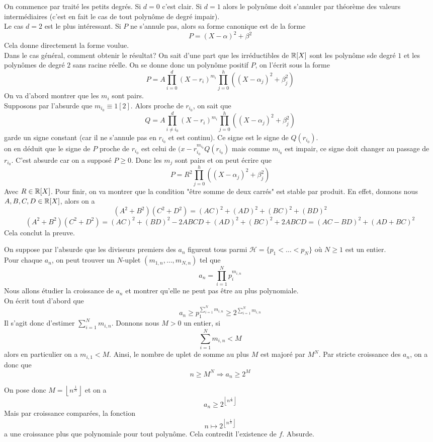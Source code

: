 \begin{sol}
On commence par traité les petits degrés. Si $d=0$ c'est clair. Si $d=1$ alors le polynôme doit s'annuler par théorème des valeurs intermédiaires (c'est en fait le cas de tout polynôme de degré impair).
\\
Le cas $d=2$ est le plus intéressant. Si $P$ ne s'annule pas, alors sa forme canonique est de la forme
$$P=(X-\alpha)^2+\beta^2 $$
Cela donne directement la forme voulue.
\\
Dans le cas général, comment obtenir le résultat? On sait d'une part que les irréductibles de $\mathbb R[X]$ sont les polynôme sde degré $1$ et les polynômes de degré $2$ sans racine réelle. On se donne donc un polynôme positif $P$, on l'écrit sous la forme
$$P=A\prod_{i=0}^d(X-r_i)^{m_i}\prod_{j=0}^h((X-\alpha_j)^2+\beta_j^2) $$
On va d'abord montrer que les $m_i$ sont pairs. \\
Supposons par l'absurde que $m_{i_0}\equiv 1[2]$. Alors proche de $r_{i_0}$, on sait que 
$$Q=A\prod_{i\neq i_0}^d(X-r_i)^{m_i}\prod_{j=0}^h((X-\alpha_j)^2+\beta_j^2) $$ garde un signe constant (car il ne s'annule pas en $r_{i_0}$ et est continu). Ce signe est le signe de $Q(r_{i_0})$.
\\
on en déduit que le signe de $P$ proche de $r_{i_0}$ est celui de $(x-r_{i_0}^{m_{i_0}}Q(r_{i_0})$ mais comme $m_{i_0}$ est impair, ce signe doit changer au passage de $r_{i_0}$. C'est absurde car on a supposé $P\geq 0$. Donc les $m_j$ sont pairs et on peut écrire que 
$$P=R^2\prod_{j=0}^h((X-\alpha_j)^2+\beta_j^2) $$
Avec $R\in \mathbb R[X]$. Pour finir, on va montrer que la condition "être somme de deux carrés" est stable par produit. En effet, donnons nous $A,B,C,D\in \mathbb R[X]$, alors on a 
$$(A^2+B^2)(C^2+D^2)=(AC)^2+(AD)^2+(BC)^2+(BD)^2$$
$$(A^2+B^2)(C^2+D^2)=(AC)^2+(BD)^2-2ABCD+(AD)^2+(BC)^2+2ABCD=(AC-BD)^2+(AD+BC)^2 $$
Cela conclut la preuve.
\end{sol}

\begin{sol}
On suppose par l'absurde que les diviseurs premiers des $a_n$ figurent tous parmi $\mathcal{H}=\{p_1<\dots<p_N\}$ où $N\geq 1$ est un entier. 
\\
Pour chaque $a_n$, on peut trouver un $N$-uplet $(m_{1,n},\dots,m_{N,n})$ tel que 
$$a_n=\prod_{i=1}^Np_i^{m_{i,n}} $$
Nous allons étudier la croissance de $a_n$ et montrer qu'elle ne peut pas être au plus polynomiale.
\\
On écrit tout d'abord que 
$$a_n\geq p_1^{\sum_{i=1}^Nm_{i,n}}\geq 2^{\sum_{i=1}^Nm_{i,n}} $$
Il s'agit donc d'estimer 
$\sum_{i=1}^Nm_{i,n}$.
Donnons nous $M>0$ un entier, si $$ \sum_{i=1}^Nm_{i,n}<M$$ alors en particulier on a $m_{i,1}<M$. Ainsi, le nombre de uplet de somme au plus $M$ est majoré par $M^N$. Par stricte croissance des $a_n$, on a donc que 
$$n\geq M^N\Rightarrow a_n\geq 2^M $$

On pose donc $M=\left\lfloor n^{\frac{1}{N}} \right\rfloor$ et on a 
$$a_n\geq 2^{\left\lfloor n^{\frac{1}{N}} \right\rfloor} $$
Mais par croissance comparées, la fonction 
$$n\mapsto 2^{\left\lfloor n^{\frac{1}{N}} \right\rfloor} $$ a une croissance plus que polynomiale pour tout polynôme. Cela contredit l'existence de $f$. Absurde. 
\end{sol}

